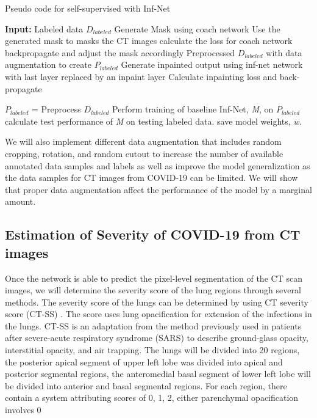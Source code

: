 \begin{algorithm}
	\caption{Pseudo code for self-supervised with Inf-Net}
	\label{alg:self-inf-net}
	\begin{algorithmic}
		\STATE \textbf{Input:} Labeled data $D_{labeled}$
			\STATE Generate Mask using coach network
			\STATE Use the generated mask to masks the CT images
			\STATE calculate the loss for coach network
			\STATE backpropagate and adjust the mask accordingly
			\ENDFOR
			\STATE Preprocessed $D_{labeled}$ with data augmentation to create $P_{labeled}$
			\STATE Generate inpainted output using inf-net network with last layer replaced by an inpaint layer
			\STATE Calculate inpainting loss and back-propagate
			\ENDFOR
		\ENDFOR 
		

		\STATE $P_{labeled}$ = Preprocess $D_{labeled}$
		\STATE Perform training of baseline Inf-Net, \textit{M}, on $P_{labeled}$
		\STATE calculate test performance of \textit{M} on testing labeled data.
		\STATE save model weights, \textit{w}.
		\ENDFOR
	\end{algorithmic}
\end{algorithm}

We will also implement different data augmentation that includes random cropping, rotation, and random cutout \cite{ref7,ref15,ref16} to increase the number of available annotated data samples and labels as well as improve the model generalization as the data samples for CT images from COVID-19 can be limited. We will show that proper data augmentation affect the performance of the model by a marginal amount.


\subsection{Estimation of Severity of COVID-19 from CT images}
Once the network is able to predict the pixel-level segmentation of the CT scan images, we will determine the severity score of the lung regions through several methods. The severity score of the lungs can be determined by using CT severity score (CT-SS) \cite{ref11}. The score uses lung opacification for extension of the infections in the lungs. CT-SS is an adaptation from the method previously used in patients after severe-acute respiratory syndrome (SARS) \cite{ref10} to describe ground-glass opacity, interstitial opacity, and air trapping. The lungs will be divided into 20 regions, the posterior apical segment of upper left lobe was divided into apical and posterior segmental regions, the anteromedial basal segment of lower left lobe will be divided into anterior and basal segmental regions. For each region, there contain a system attributing scores of 0, 1, 2, either parenchymal opacification involves 0%

